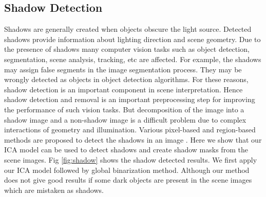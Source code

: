 \subsection{Shadow Detection}
Shadows are generally created when objects obscure the light source. 
Detected shadows provide information about
lighting direction and scene geometry.
Due to the presence of shadows many computer vision 
tasks such as object detection, segmentation, scene analysis, tracking, etc are affected.
For example, the shadows may assign false segments in the 
image segmentation process. They may be wrongly detected as objects in 
object detection algorithms.
For these reasons,
shadow detection is an important component in scene interpretation.
Hence 
shadow detection and removal is an important preprocessing step for improving the performance of such vision tasks.
But decomposition of the image into a shadow image and a non-shadow image
is a difficult problem due to 
complex interactions of geometry and illumination.
Various pixel-based and region-based methods are
proposed to detect the shadows in an image \cite{chap4-8, chap4-9, chap4-10, chap4-11}.
Here we show that our ICA model can be used to detect shadows and create shadow masks from the scene images.
Fig \ref{fig:shadow} shows the shadow detected results. We first apply our ICA model followed by
global binarization method. Although our method does not give good results if some dark objects are present in the scene
images which are mistaken as shadows.

